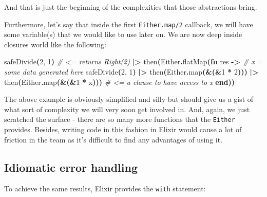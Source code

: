 \documentclass[
  oneside]{book}
\newenvironment{Shaded}{\begin{snugshade}}{\end{snugshade}}
\newcommand{\CommentTok}[1]{\textcolor[rgb]{0.56,0.35,0.01}{\textit{#1}}}
\newcommand{\ConstantTok}[1]{\textcolor[rgb]{0.56,0.35,0.01}{#1}}
\newcommand{\DecValTok}[1]{\textcolor[rgb]{0.00,0.00,0.81}{#1}}
\newcommand{\FunctionTok}[1]{\textcolor[rgb]{0.13,0.29,0.53}{\textbf{#1}}}
\newcommand{\KeywordTok}[1]{\textcolor[rgb]{0.13,0.29,0.53}{\textbf{#1}}}
\newcommand{\NormalTok}[1]{#1}
\newcommand{\OperatorTok}[1]{\textcolor[rgb]{0.81,0.36,0.00}{\textbf{#1}}}
\begin{document}
And that is just the beginning of the complexities that those abstractions bring.

Furthermore, let's say that inside the first \texttt{Either.map/2} callback, we will have some variable(s) that we would like to use later on. We are now deep inside closures world like the following:

\begin{Shaded}
\begin{Highlighting}[]
\NormalTok{safeDivide}\FunctionTok{(}\DecValTok{2}\NormalTok{, }\DecValTok{1}\FunctionTok{)} \CommentTok{\# \textless{}= returns Right(2)}
\OperatorTok{|\textgreater{}}\NormalTok{ then}\FunctionTok{(}\ConstantTok{Either}\OperatorTok{.}\NormalTok{flatMap}\FunctionTok{(}\KeywordTok{fn}\NormalTok{ res }\OperatorTok{{-}\textgreater{}}
    \CommentTok{\# x = some data generated here}
\NormalTok{    safeDivide}\FunctionTok{(}\DecValTok{2}\NormalTok{, }\DecValTok{1}\FunctionTok{)}
    \OperatorTok{|\textgreater{}}\NormalTok{ then}\FunctionTok{(}\ConstantTok{Either}\OperatorTok{.}\NormalTok{map}\FunctionTok{(}\OperatorTok{\&}\FunctionTok{(}\OperatorTok{\&}\DecValTok{1} \OperatorTok{*} \DecValTok{2}\FunctionTok{)))}
    \OperatorTok{|\textgreater{}}\NormalTok{ then}\FunctionTok{(}\ConstantTok{Either}\OperatorTok{.}\NormalTok{map}\FunctionTok{(}\OperatorTok{\&}\FunctionTok{(}\OperatorTok{\&}\DecValTok{1} \OperatorTok{*}\NormalTok{ x}\FunctionTok{)))} \CommentTok{\# \textless{}= a clause to have access to x}
  \KeywordTok{end}\FunctionTok{))}
\end{Highlighting}
\end{Shaded}

The above example is obviously simplified and silly but should give us a gist of what sort of complexity we will very soon get involved in. And, again, we just scratched the surface - there are so many more functions that the \texttt{Either} provides. Besides, writing code in this fashion in Elixir would cause a lot of friction in the team as it's difficult to find any advantages of using it.

\subsection{Idiomatic error handling}\label{idiomatic-error-handling}

To achieve the same results, Elixir provides the \texttt{with} statement:
\end{document}
